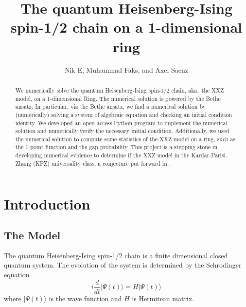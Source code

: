 \documentclass[11pt]{article}
\numberwithin{equation}{section}
\theoremstyle{plain}
\theoremstyle{plain}
\theoremstyle{definition}
\begin{document}
\title{\vspace{-8ex} The quantum Heisenberg-Ising spin-1/2 chain on a 1-dimensional ring}

\author{Nik E, Muhammad Faks, and Axel Saenz}


\date{}

\maketitle

\begin{abstract}
  We numerically solve the quantum Heisenberg-Ising spin-1/2 chain, aka.~the XXZ model, on a 1-dimensional Ring. The numerical solution is powered by the Bethe ansatz. In particular, via the Bethe ansatz, we find a numerical solution by (numerically) solving a system of algebraic equation and checking an initial condition identity. We developed an open-access Python program to implement the numerical solution and numerically verify the necessary initial condition. Additionally, we used the numerical solution to compute some statistics of the XXZ model on a ring, such as the 1-point function and the gap probability. This project is a stepping stone in developing numerical evidence to determine if the XXZ model in the Kardar-Parisi-Zhang (KPZ) universality class, a conjecture put forward in \cite{STW22}.
\end{abstract}






\section{Introduction}

\subsection{The Model}

The quantum Heisenberg-Ising spin-1/2 chain is a finite dimensional closed quantum system. The evolution of the system is determined by the Schrodinger equation
\begin{equation}
    i\frac{d}{dt} | \Psi (t) \rangle = H  | \Psi (t) \rangle
\end{equation}
where $| \Psi (t) \rangle$ is the wave function and $H$ is Hermitean matrix.
\end{document}
